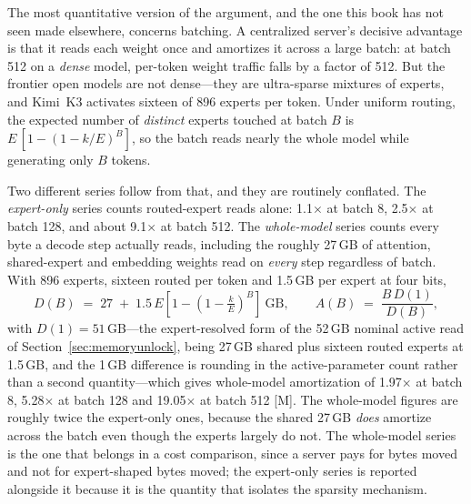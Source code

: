 The most quantitative version of the argument, and the one this book has not seen made elsewhere, concerns batching. A centralized server's decisive advantage is that it reads each weight once and amortizes it across a large batch: at batch 512 on a \emph{dense} model, per-token weight traffic falls by a factor of 512. But the frontier open models are not dense---they are ultra-sparse mixtures of experts, and Kimi~K3 activates sixteen of 896 experts per token. Under uniform routing, the expected number of \emph{distinct} experts touched at batch $B$ is $E\,[1-(1-k/E)^B]$, so the batch reads nearly the whole model while generating only $B$ tokens.

Two different series follow from that, and they are routinely conflated. The \emph{expert-only} series counts routed-expert reads alone: 1.1$\times$ at batch 8, 2.5$\times$ at batch 128, and about 9.1$\times$ at batch 512. The \emph{whole-model} series counts every byte a decode step actually reads, including the roughly 27\,GB of attention, shared-expert and embedding weights read on \emph{every} step regardless of batch. With 896 experts, sixteen routed per token and 1.5\,GB per expert at four bits,
\begin{equation}
  D(B) \;=\; 27 \;+\; 1.5\,E\!\left[1-\left(1-\tfrac{k}{E}\right)^{B}\right]\ \mathrm{GB},
  \qquad A(B) \;=\; \frac{B\,D(1)}{D(B)},
  \label{eq:amort}
\end{equation}
with $D(1)=51$\,GB---the expert-resolved form of the 52\,GB nominal active read of Section~\ref{sec:memoryunlock}, being 27\,GB shared plus sixteen routed experts at 1.5\,GB, and the 1\,GB difference is rounding in the active-parameter count rather than a second quantity---which gives whole-model amortization of 1.97$\times$ at batch 8, 5.28$\times$ at batch 128 and 19.05$\times$ at batch 512 [M]. The whole-model figures are roughly twice the expert-only ones, because the shared 27\,GB \emph{does} amortize across the batch even though the experts largely do not. The whole-model series is the one that belongs in a cost comparison, since a server pays for bytes moved and not for expert-shaped bytes moved; the expert-only series is reported alongside it because it is the quantity that isolates the sparsity mechanism.

